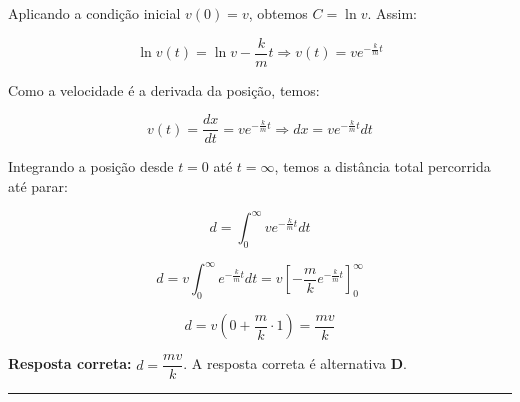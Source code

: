 \begin{flushleft}
Aplicando a condi\c{c}\~ao inicial \( v(0) = v \), obtemos \( C = \ln v \). Assim:

\[
\ln v(t) = \ln v - \frac{k}{m}t \Rightarrow v(t) = v e^{-\frac{k}{m}t}
\]

Como a velocidade \'e a derivada da posi\c{c}\~ao, temos:

\[
v(t) = \frac{dx}{dt} = v e^{-\frac{k}{m}t}
\Rightarrow dx = v e^{-\frac{k}{m}t} dt
\]

Integrando a posi\c{c}\~ao desde \( t = 0 \) at\'e \( t = \infty \), temos a dist\^ancia total percorrida at\'e parar:

\[
d = \int_0^{\infty} v e^{-\frac{k}{m}t} dt
\]

\[
d = v \int_0^{\infty} e^{-\frac{k}{m}t} dt = v \left[ -\frac{m}{k} e^{-\frac{k}{m}t} \right]_0^{\infty}
\]

\[
d = v \left( 0 + \frac{m}{k} \cdot 1 \right) = \frac{mv}{k}
\]

\textbf{Resposta correta:} \(\boxed{d = \dfrac{mv}{k}}\). A resposta correta é alternativa \colorbox{green!50}{\textbf{D}}.

\end{flushleft}

\noindent\rule{\linewidth}{0.6pt}\\

